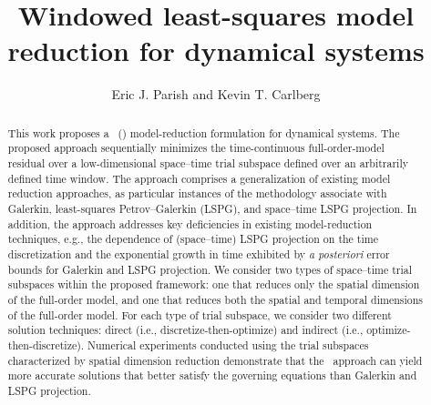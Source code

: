 \documentclass[3p,computermodern,10pt]{elsarticle}
\begin{document}
\begin{frontmatter}

\title{Windowed least-squares model reduction for dynamical systems}

\author[a]{Eric J. Parish and Kevin T. Carlberg}

\address[a]{Sandia National Laboratories,  Livermore, CA}
\begin{abstract}
This work proposes a \methodNameLower\ (\methodAcronym) model-reduction
	formulation for dynamical systems. The proposed approach sequentially minimizes the
	time-continuous full-order-model residual over a low-dimensional space--time trial
	subspace defined over an arbitrarily defined time window. The approach comprises a generalization 
of existing model reduction approaches, as particular instances of
  the methodology associate with Galerkin,
	least-squares Petrov--Galerkin (LSPG), and space–time LSPG projection. In
	addition, the approach
	addresses key deficiencies in existing model-reduction
	techniques, e.g., the dependence of (space--time) LSPG projection on the
	time discretization and the exponential growth in time exhibited by \textit{a posteriori}
	error bounds for Galerkin and LSPG projection.  We consider two types of
	space--time trial
	subspaces within the proposed framework: one that reduces only the spatial
	dimension of the full-order model, and one that reduces both the spatial and
	temporal dimensions of the full-order model.  For each type of trial
	subspace, we consider two different solution techniques: direct (i.e.,
	discretize-then-optimize) and indirect (i.e., optimize-then-discretize).
	Numerical experiments conducted using the trial subspaces characterized by spatial
	dimension reduction demonstrate that the \methodAcronym\
	approach can yield more accurate solutions that better satisfy the governing equations than
	Galerkin and LSPG projection. 


\end{abstract}
\end{frontmatter}
\end{document}
